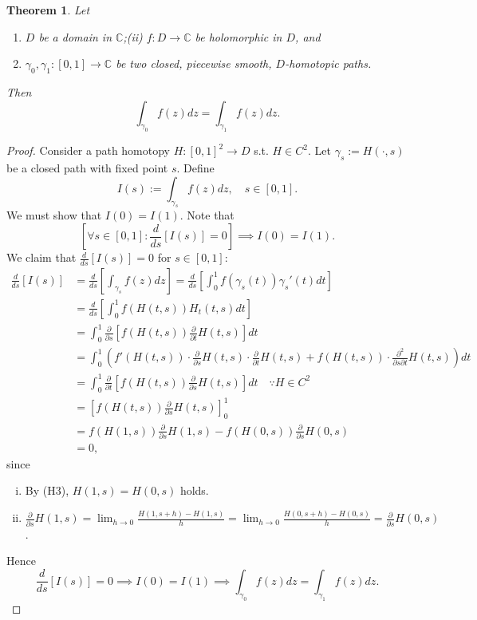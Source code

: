 \documentclass[12pt,openany]{book}
\newtheorem{theorem}{Theorem}[chapter]
\theoremstyle{definition}
\newcommand{\C}{\mathbb{C}}
\newcommand{\of}[1]{\left( #1 \right)}
\begin{document}
	\newpage
	\begin{tcolorbox}[colback=white,colframe=thmcolor,arc=5pt,title={\color{white}\bf The Cauchy Integral Theorem}]
		\begin{theorem}
			Let \begin{enumerate}
				\item[(i)] $D$ be a domain in $\C$;\quad (ii) $f:D\to\C$ be holomorphic in $D$, and
				\item[(iii)] $\gamma_0,\gamma_1:[0,1]\to\C$ be two closed, piecewise smooth, $D$-homotopic paths.
			\end{enumerate} Then \[
			\int_{\gamma_0}f\of{z}dz=\int_{\gamma_1}f\of{z}dz.
			\]
		\end{theorem}
	\end{tcolorbox}
	\begin{proof}
		Consider a path homotopy $H:[0,1]^2\to D$ s.t. $H\in C^2$. Let $\gamma_s:=H\of{\cdot, s}$ be a closed path with fixed point $s$. Define \[
		I\of{s}:=\int_{\gamma_s}f\of{z}dz,\quad s\in[0,1].
		\] We must show that $I(0)=I(1)$. Note that \[
		\left[\forall s\in[0,1]:\frac{d}{ds}\left[I(s)\right]=0\right]\implies I(0)=I(1).
		\] We claim that $\displaystyle\frac{d}{ds}\left[I(s)\right]=0$ for $s\in[0,1]$:
		\begin{align*}
		\frac{d}{ds}\left[I(s)\right]&=\frac{d}{ds}\left[\int_{\gamma_s}f\of{z}dz\right]=\frac{d}{ds}\left[\int_0^1f\of{\gamma_s\of{t}}\gamma_s'\of{t}dt\right]\\
		&=\frac{d}{ds}\left[\int_0^1f\of{H\of{t,s}}H_t\of{t,s}dt\right]\\
		&=\int_0^1\frac{\partial}{\partial s}\left[f\of{H\of{t,s}}\frac{\partial}{\partial t}H\of{t,s}\right]dt\\
		&=\int_0^1\left(f'\of{H(t,s)}\cdot \frac{\partial}{\partial s}H\of{t,s}\cdot \frac{\partial}{\partial t}H\of{t,s}+f\of{H(t,s)}\cdot \frac{\partial^2}{\partial s\partial t}H\of{t,s}\right)dt\\
		&=\int_0^1\frac{\partial}{\partial t}\left[f\of{H(t,s)}\frac{\partial }{\partial s}H\of{t,s}\right]dt\quad\because H\in C^2\\
		&=\left[f\of{H(t,s)}\frac{\partial }{\partial s}H\of{t,s}\right]_0^1\\
		&=f\of{H\of{1,s}}\frac{\partial}{\partial s}H\of{1,s}-f\of{H\of{0,s}}\frac{\partial}{\partial s}H\of{0,s}\\
		&=0,
		\end{align*} since \begin{enumerate}[(i)]
			\item By (H3), $H\of{1,s}=H\of{0,s}$ holds.
			\item $\displaystyle\frac{\partial}{\partial s}H\of{1,s}=\lim_{h\to 0}\frac{H\of{1,s+h}-H\of{1,s}}{h}=\lim_{h\to 0}\frac{H\of{0,s+h}-H\of{0,s}}{h}=\frac{\partial}{\partial s}H\of{0,s}$.
		\end{enumerate}
		Hence \[
		\frac{d}{ds}\left[I\of{s}\right]=0\implies I\of{0}=I\of{1}\implies
		\int_{\gamma_0}f\of{z}dz=\int_{\gamma_1}f\of{z}dz.
		\]
	\end{proof}
\end{document}
